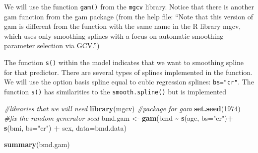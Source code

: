 \documentclass[
]{book}
\newenvironment{Shaded}{\begin{snugshade}}{\end{snugshade}}
\newcommand{\AttributeTok}[1]{\textcolor[rgb]{0.13,0.29,0.53}{#1}}
\newcommand{\CommentTok}[1]{\textcolor[rgb]{0.56,0.35,0.01}{\textit{#1}}}
\newcommand{\ConstantTok}[1]{\textcolor[rgb]{0.56,0.35,0.01}{#1}}
\newcommand{\DecValTok}[1]{\textcolor[rgb]{0.00,0.00,0.81}{#1}}
\newcommand{\FunctionTok}[1]{\textcolor[rgb]{0.13,0.29,0.53}{\textbf{#1}}}
\newcommand{\NormalTok}[1]{#1}
\newcommand{\OtherTok}[1]{\textcolor[rgb]{0.56,0.35,0.01}{#1}}
\newcommand{\SpecialCharTok}[1]{\textcolor[rgb]{0.81,0.36,0.00}{\textbf{#1}}}
\newcommand{\StringTok}[1]{\textcolor[rgb]{0.31,0.60,0.02}{#1}}
\begin{document}
\begin{Shaded}
\end{Shaded}

We will use the function \texttt{gam()} from the \texttt{mgcv} library. Notice that there is
another gam function from the gam package (from the help file: ``Note that this version of gam is different from the function with the same name in the R library mgcv, which uses only smoothing splines with a focus on automatic smoothing parameter selection via GCV.'')

The function \texttt{s()} within the model indicates that we want to smoothing spline
for that predictor. There are several types of splines implemented in the
function. We will use the option basis spline equal to cubic regression splines:
\texttt{bs="cr"}. The function \texttt{s()} has similarities to the \texttt{smooth.spline()} but
is implemented

\begin{Shaded}
\begin{Highlighting}[]
\CommentTok{\#libraries that we will need}
\FunctionTok{library}\NormalTok{(mgcv)   }\CommentTok{\#package for gam}
\FunctionTok{set.seed}\NormalTok{(}\DecValTok{1974}\NormalTok{) }\CommentTok{\#fix the random generator seed }
\NormalTok{bmd.gam }\OtherTok{\textless{}{-}} \FunctionTok{gam}\NormalTok{(bmd }\SpecialCharTok{\textasciitilde{}} \FunctionTok{s}\NormalTok{(age, }\AttributeTok{bs=}\StringTok{"cr"}\NormalTok{)}\SpecialCharTok{+} \FunctionTok{s}\NormalTok{(bmi, }\AttributeTok{bs=}\StringTok{"cr"}\NormalTok{) }\SpecialCharTok{+}\NormalTok{ sex, }\AttributeTok{data=}\NormalTok{bmd.data)}

\FunctionTok{summary}\NormalTok{(bmd.gam)}
\end{Highlighting}
\end{Shaded}
\end{document}
